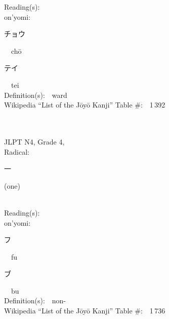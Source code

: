 \begin{multicols}{2}
Reading(s):\ \ \\
{\hspace*{1em}}on'yomi:\ \ \\
{\hspace*{2em}}{\begin{CJK}{UTF8}{min} チョウ \end{CJK}}\ \ ch\=o\ \ \\
{\hspace*{2em}}{\begin{CJK}{UTF8}{min} テイ \end{CJK}}\ \ tei\ \ \\
Definition(s):\ \ ward \\
Wikipedia ``List of the J\=oy\=o Kanji'' Table \#:\ \ 1\,392 \\
\ \ \\
{\fontsize{34pt}{40pt}  }\ \ \\  %
{JLPT N4, Grade 4, \\Radical:\ \ {\begin{CJK}{UTF8}{min} 一 \end{CJK}} (one) } \\
Reading(s):\ \ \\
{\hspace*{1em}}on'yomi:\ \ \\
{\hspace*{2em}}{\begin{CJK}{UTF8}{min} フ \end{CJK}}\ \ fu\ \ \\
{\hspace*{2em}}{\begin{CJK}{UTF8}{min} ブ \end{CJK}}\ \ bu\ \ \\
Definition(s):\ \ non- \\
Wikipedia ``List of the J\=oy\=o Kanji'' Table \#:\ \ 1\,736 \\
\ \ \\
\end{multicols}



